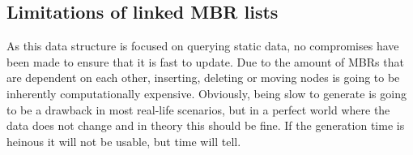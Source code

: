 \subsection{Limitations of linked MBR lists}
As this data structure is focused on querying static data, no compromises have been made to ensure that it is fast to update. Due to the amount of MBRs that are dependent on each other, inserting, deleting or moving nodes is going to be inherently computationally expensive. Obviously, being slow to generate is going to be a drawback in most real-life scenarios, but in a perfect world where the data does not change and in theory this should be fine. If the generation time is heinous it will not be usable, but time will tell. \\

